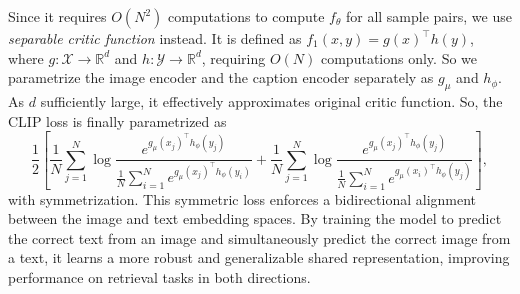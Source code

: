 Since it requires $O(N^2)$ computations to compute $f_{\theta}$ for all sample pairs, we use \emph{separable critic function} instead. It is defined as $f_1(x,y)=g(x)^{\top}h(y)$, where $g:\mathcal{X}\to\mathbb{R}^d$ and $h:\mathcal{Y}\to\mathbb{R}^d$, requiring $O(N)$ computations only. So we parametrize the image encoder and the caption encoder separately as $g_{\mu}$ and $h_{\phi}$. As $d$ sufficiently large, it effectively approximates original critic function.
So, the CLIP loss is finally parametrized as
\[
\frac12\left[\frac1N\sum_{j=1}^N\log\frac{e^{g_{\mu}(x_j)^{\top}h_{\phi}(y_j)}}{\frac1N\sum_{i=1}^Ne^{g_{\mu}(x_j)^{\top}h_{\phi}(y_i)}}+\frac1N\sum_{j=1}^N\log\frac{e^{g_{\mu}(x_j)^{\top}h_{\phi}(y_j)}}{\frac1N\sum_{i=1}^Ne^{g_{\mu}(x_i)^{\top}h_{\phi}(y_j)}}\right],\]
with symmetrization. This symmetric loss enforces a bidirectional alignment between the image and text embedding spaces. By training the model to predict the correct text from an image and simultaneously predict the correct image from a text, it learns a more robust and generalizable shared representation, improving performance on retrieval tasks in both directions.